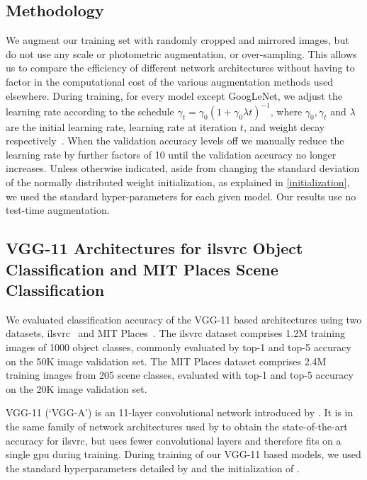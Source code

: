\documentclass[thesis]{subfiles}
\begin{document}
    \subsection{Methodology}
    We augment our training set with randomly cropped and mirrored images, but do not use any scale or photometric augmentation, or over-sampling. This allows us to compare the efficiency of different network architectures without having to factor in the computational cost of the various augmentation methods used elsewhere. During training, for every model except GoogLeNet, we adjust the learning rate according to the schedule $\gamma_t = \gamma_0(1+\gamma_0\lambda t)^{-1}$, where $\gamma_0,\gamma_t$ and $\lambda$ are the initial learning rate, learning rate at iteration $t$, and weight decay respectively~\citep{Bottou2012sgdtricks}. When the validation accuracy levels off we manually reduce the learning rate by further factors of 10 until the validation accuracy no longer increases. Unless otherwise indicated, aside from changing the standard deviation of the normally distributed weight initialization, as explained in \cref{initialization}, we used the standard hyper-parameters for each given model. Our results use no test-time augmentation.  
    
    \subsection{VGG-11 Architectures for \acrshort{ilsvrc} Object Classification and MIT Places Scene Classification}\label{vggresults}
    We evaluated classification accuracy of the VGG-11 based architectures using two datasets, \gls{ilsvrc}~\citep{Jia2014} and MIT Places~\citep{zhou2014learning}. The \gls{ilsvrc} dataset comprises 1.2M training images of 1000 object classes, commonly evaluated by top-1 and top-5 accuracy on the 50K image validation set. The MIT Places dataset comprises 2.4M training images from 205 scene classes, evaluated with top-1 and top-5 accuracy on the 20K image validation set.
    
    VGG-11 (`VGG-A') is an 11-layer convolutional network introduced by \citet{Simonyan2014verydeep}. It is in the same family of network architectures used by \citet{Simonyan2014verydeep,He2015b} to obtain the state-of-the-art accuracy for \gls{ilsvrc}, but uses fewer convolutional layers and therefore fits on a single \gls{gpu} during training. During training of our VGG-11 based models, we used the standard hyperparameters detailed by \citet{Simonyan2014verydeep} and the initialization of \citet{He2015b}.
    
\end{document}
